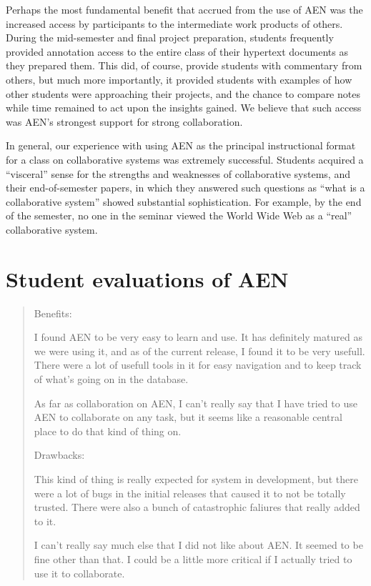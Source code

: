 Perhaps the most fundamental benefit that accrued from the use of AEN was
the increased access by participants to the intermediate work products of
others.  During the mid-semester and final project preparation, students
frequently provided annotation access to the entire class of their
hypertext documents as they prepared them.  This did, of course, provide
students with commentary from others, but much more importantly, it
provided students with examples of how other students were approaching
their projects, and the chance to compare notes while time remained to act
upon the insights gained.  We believe that such access was AEN's strongest
support for strong collaboration.

In general, our experience with using AEN as the principal instructional
format for a class on collaborative systems was extremely successful.
Students acquired a ``visceral'' sense for the strengths and weaknesses of
collaborative systems, and their end-of-semester papers, in which they
answered such questions as ``what is a collaborative system'' showed
substantial sophistication.  For example, by the end of the semester, no
one in the seminar viewed the World Wide Web as a ``real'' collaborative
system.


\section{Student evaluations of AEN}

\begin{quote}
Benefits: 

   I found AEN to be very easy to learn and use.  It has definitely matured
   as we were using it, and as of the current release, I found it to be
   very usefull.  There were a lot of usefull tools in it for easy
   navigation and to keep track of what's going on in the database.

   As far as collaboration on AEN, I can't really say that I have tried to
   use AEN to collaborate on any task, but it seems like a reasonable
   central place to do that kind of thing on.

Drawbacks: 

   This kind of thing is really expected for system in development, but
   there were a lot of bugs in the initial releases that caused it to not
   be totally trusted.  There were also a bunch of catastrophic faliures
   that really added to it.

   I can't really say much else that I did not like about AEN.  It seemed
   to be fine other than that.  I could be a little more critical if I
   actually tried to use it to collaborate.
\end{quote}


